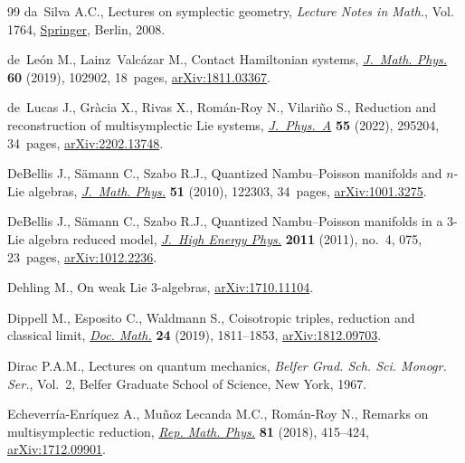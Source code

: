 \begin{thebibliography}{99}
da~Silva A.C., Lectures on symplectic geometry, \textit{Lecture Notes in
  Math.}, Vol. 1764, \href{https://doi.org/10.1007/978-3-540-45330-7}{Springer}, Berlin, 2008.

de~Le\'on M., Lainz~Valc\'azar M., Contact {H}amiltonian systems,
  \href{https://doi.org/10.1063/1.5096475}{\textit{J.~Math. Phys.}} \textbf{60} (2019), 102902, 18~pages,
  \href{https://arxiv.org/abs/1811.03367}{arXiv:1811.03367}.

de~Lucas J., Gr\`acia X., Rivas X., Rom\'an-Roy N., Vilari\~no S., Reduction
  and reconstruction of multisymplectic {L}ie systems, \href{https://doi.org/10.1088/1751-8121/ac78ab}{\textit{J.~Phys.~A}}
  \textbf{55} (2022), 295204, 34~pages, \href{https://arxiv.org/abs/2202.13748}{arXiv:2202.13748}.

DeBellis J., S\"amann C., Szabo R.J., Quantized {N}ambu--{P}oisson manifolds
  and {$n$}-{L}ie algebras, \href{https://doi.org/10.1063/1.3503773}{\textit{J.~Math. Phys.}} \textbf{51} (2010), 122303,
  34~pages, \href{https://arxiv.org/abs/1001.3275}{arXiv:1001.3275}.

DeBellis J., S\"amann C., Szabo R.J., Quantized {N}ambu--{P}oisson manifolds in
  a 3-{L}ie algebra reduced model, \href{https://doi.org/10.1007/JHEP04(2011)075}{\textit{J.~High Energy Phys.}} \textbf{2011}
  (2011), no.~4, 075, 23~pages, \href{https://arxiv.org/abs/1012.2236}{arXiv:1012.2236}.

Dehling M., On weak Lie 3-algebras, \href{https://arxiv.org/abs/1710.11104}{arXiv:1710.11104}.

Dippell M., Esposito C., Waldmann S., Coisotropic triples, reduction and
  classical limit, \href{https://doi.org/10.4171/DM/716}{\textit{Doc. Math.}} \textbf{24} (2019), 1811--1853,
  \href{https://arxiv.org/abs/1812.09703}{arXiv:1812.09703}.

Dirac P.A.M., Lectures on quantum mechanics, \textit{Belfer Grad. Sch. Sci.
  Monogr. Ser.}, Vol.~2, Belfer Graduate School of Science, New York, 1967.

Echeverr\'ia-Enr\'iquez A., Mu\~noz Lecanda M.C., Rom\'an-Roy N., Remarks on
  multisymplectic reduction, \href{https://doi.org/10.1016/S0034-4877(18)30057-0}{\textit{Rep. Math. Phys.}} \textbf{81} (2018),
  415--424, \href{https://arxiv.org/abs/1712.09901}{arXiv:1712.09901}.


\end{thebibliography}
